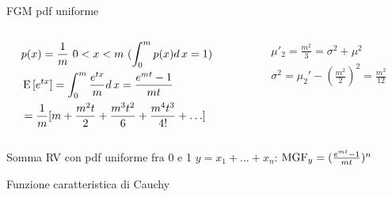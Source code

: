 \begin{wordonframe}{FGM pdf uniforme}
\begin{columns}[T]
\begin{column}{0.5\textwidth}
\begin{align*}
&p(x)=\frac{1}{m}\ 0<x<m\ (\int_0^mp(x)d\,x=1)\\
&\operatorname{E}{[e^{tx}]}=\int_0^m\frac{e^{tx}}{m}d\,x=\frac{e^{mt}-1}{mt}\\
&=\frac{1}{m}[m+\frac{m^2t}{2}+\frac{m^3t^2}{6}+\frac{m^4t^3}{4!}+\ldots]
\end{align*}
\end{column}
\begin{column}{0.5\textwidth}
\begin{align*}
&\mu'_2=\frac{m^2}{3}=\sigma^2+\mu^2\\
&\sigma^2=\mu_2'-(\frac{m^2}{2})^2=\frac{m^2}{12}
\end{align*}
\end{column}
\end{columns}
\begin{block}{Somma RV con pdf uniforme fra 0 e 1}
$y=x_1+\ldots+x_n$: $\operatorname{MGF}_y=(\frac{e^{mt}-1}{mt})^n$
\end{block}
\end{wordonframe}

\begin{wordonframe}{Funzione caratteristica di Cauchy}

\end{wordonframe}

